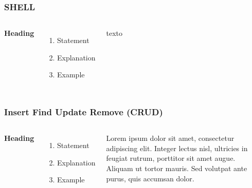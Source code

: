 \documentclass{beamer}
\begin{document}
\begin{frame}
\frametitle{SHELL}
\begin{columns}[c] %

\textbf{Heading}
\begin{enumerate}
\item Statement
\item Explanation
\item Example
\end{enumerate}

texto
\end{columns}
\end{frame}


\begin{frame}
\frametitle{Insert Find Update Remove (CRUD)}
\begin{columns}[c] %

\textbf{Heading}
\begin{enumerate}
\item Statement
\item Explanation
\item Example
\end{enumerate}

Lorem ipsum dolor sit amet, consectetur adipiscing elit. Integer lectus nisl, ultricies in feugiat rutrum, porttitor sit amet augue. Aliquam ut tortor mauris. Sed volutpat ante purus, quis accumsan dolor.

\end{columns}
\end{frame}

\end{document}
